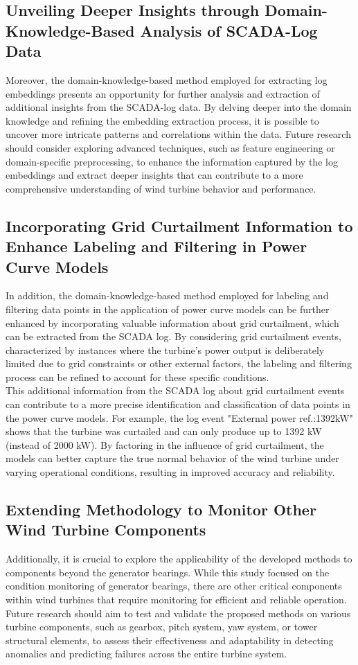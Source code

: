 \subsection{Unveiling Deeper Insights through Domain-Knowledge-Based Analysis of SCADA-Log Data}
Moreover, the domain-knowledge-based method employed for extracting log embeddings presents an opportunity for further analysis and extraction of additional insights from the SCADA-log data. 
By delving deeper into the domain knowledge and refining the embedding extraction process, it is possible to uncover more intricate patterns and correlations within the data. 
Future research should consider exploring advanced techniques, such as feature engineering or domain-specific preprocessing, to enhance the information captured by the log embeddings and extract deeper insights that can contribute to a more comprehensive understanding of wind turbine behavior and performance.

\subsection{Incorporating Grid Curtailment Information to Enhance Labeling and Filtering in Power Curve Models}
\label{sub:Curtailment}
In addition, the domain-knowledge-based method employed for labeling and filtering data points in the application of power curve models 
can be further enhanced by incorporating valuable information about grid curtailment, 
which can be extracted from the SCADA log.
By considering grid curtailment events, characterized by instances where the turbine's power output is deliberately limited due to grid constraints or other external factors, 
the labeling and filtering process can be refined to account for these specific conditions. \\

This additional information from the SCADA log about grid curtailment events can contribute to a more precise identification and 
classification of data points in the power curve models. For example, the log event "External power ref.:1392kW" shows that the turbine 
was curtailed and can only produce up to 1392 kW (instead of 2000 kW).
By factoring in the influence of grid curtailment, the models can better capture the true normal behavior of the wind turbine under varying operational conditions, 
resulting in improved accuracy and reliability.

\subsection{Extending Methodology to Monitor Other Wind Turbine Components}
Additionally, it is crucial to explore the applicability of the developed methods to components beyond the generator bearings. 
While this study focused on the condition monitoring of generator bearings, there are other critical components within wind turbines that require monitoring for efficient and reliable operation. 
Future research should aim to test and validate the proposed methods on various turbine components, such as gearbox, pitch system, yaw system, or tower structural elements, to assess their effectiveness and adaptability in detecting anomalies and predicting failures across the entire turbine system.

